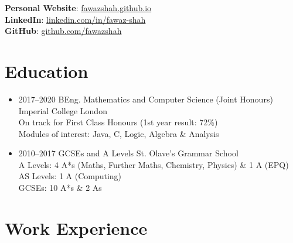\documentclass[11pt,a4paper,sans]{moderncv}        %
\begin{document}
\maketitle

\vspace{-30pt}

\begin{center}
\textbf{Personal Website}: \href{https://fawazshah.github.io/}{fawazshah.github.io} \\
\textbf{LinkedIn}: \href{https://www.linkedin.com/in/fawaz-shah/}{linkedin.com/in/fawaz-shah} \\
\textbf{GitHub}: \href{https://github.com/fawazshah/}{github.com/fawazshah}
\end{center}

\section{Education}

\vspace{5pt}

\begin{itemize}

\item{
\cventry
{2017--2020}
{BEng. Mathematics and Computer Science (Joint Honours)}
{Imperial College London}
{}{}{
\noindent
\\
On track for First Class Honours (1st year result: 72\%)
\\
Modules of interest: Java, C, Logic, Algebra \& Analysis
}
} %

\item{
\cventry
{2010--2017}
{GCSEs and A Levels}
{St. Olave's Grammar School}
{}{}{
\noindent
\\
A Levels: 4 A*s (Maths, Further Maths, Chemistry, Physics) \& 1 A (EPQ)
\\
AS Levels: 1 A (Computing)
\\
GCSEs: 10 A*s \& 2 As
}}

\end{itemize}

\section{Work Experience}
\end{document}
